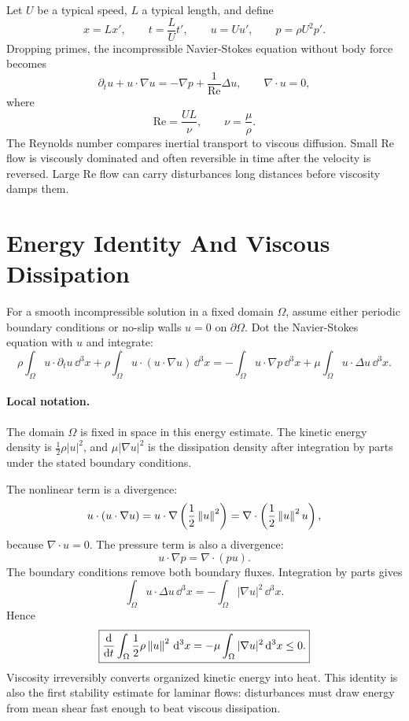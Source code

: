 Let \(U\) be a typical speed, \(L\) a typical length, and define
\[
  x=Lx',\qquad
  t=\frac{L}{U}t',\qquad
  u=Uu',\qquad
  p=\rho U^2p'.
\]
Dropping primes, the incompressible Navier-Stokes equation without body force
becomes
\[
  \partial_tu+u\cdot\nabla u
  =
  -\nabla p+\frac1{\mathrm{Re}}\Delta u,
  \qquad
  \nabla\cdot u=0,
\]
where
\[
  \boxed{\mathrm{Re}=\frac{UL}{\nu}},\qquad \nu=\frac{\mu}{\rho}.
\]
The Reynolds number compares inertial transport to viscous diffusion. Small
\(\mathrm{Re}\) flow is viscously dominated and often reversible in time after
the velocity is reversed. Large \(\mathrm{Re}\) flow can carry disturbances
long distances before viscosity damps them.

\section{Energy Identity And Viscous Dissipation}
\label{sec:fluid-energy-identity}

For a smooth incompressible solution in a fixed domain \(\Omega\), assume either
periodic boundary conditions or no-slip walls \(u=0\) on \(\partial\Omega\).
Dot the Navier-Stokes equation with \(u\) and integrate:
\[
  \rho\int_\Omega u\cdot\partial_tu\,\dd^3x
  +
  \rho\int_\Omega u\cdot(u\cdot\nabla u)\,\dd^3x
  =
  -\int_\Omega u\cdot\nabla p\,\dd^3x
  +
  \mu\int_\Omega u\cdot\Delta u\,\dd^3x.
\]

\paragraph{Local notation.}
The domain \(\Omega\) is fixed in space in this energy estimate.  The kinetic
energy density is \(\frac12\rho|u|^2\), and \(\mu|\nabla u|^2\) is the
dissipation density after integration by parts under the stated boundary
conditions.

The nonlinear term is a divergence:
\[
  u\cdot(u\cdot\nabla u)=u\cdot\nabla\left(\frac12\left\lVert u\right\rVert^2\right)
  =
  \nabla\cdot\left(\frac12\left\lVert u\right\rVert^2u\right),
\]
because \(\nabla\cdot u=0\). The pressure term is also a divergence:
\[
  u\cdot\nabla p=\nabla\cdot(pu).
\]
The boundary conditions remove both boundary fluxes. Integration by parts gives
\[
  \int_\Omega u\cdot\Delta u\,\dd^3x
  =
  -\int_\Omega |\nabla u|^2\,\dd^3x.
\]
Hence
\[
  \boxed{
  \frac{\mathrm{d}}{\mathrm{d} t}
  \int_\Omega \frac12\rho\left\lVert u\right\rVert^2\,\mathrm{d}^3x
  =
  -\mu\int_\Omega |\nabla u|^2\,\mathrm{d}^3x\leq0.
  }
\]
Viscosity irreversibly converts organized kinetic energy into heat. This
identity is also the first stability estimate for laminar flows: disturbances
must draw energy from mean shear fast enough to beat viscous dissipation.

